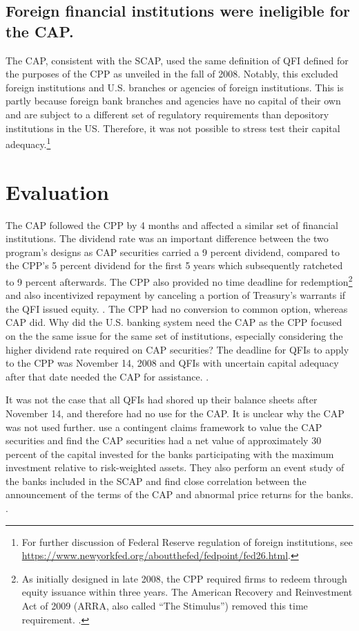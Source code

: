 \documentclass[12pt]{article}
\begin{document}
\subsection{Foreign financial institutions were ineligible for the CAP.}

The CAP, consistent with the SCAP, used the same definition of QFI defined for the purposes of the CPP as unveiled in the fall of 2008. Notably, this excluded foreign institutions and U.S. branches or agencies of foreign institutions. This is partly because foreign bank branches and agencies have no capital of their own and are subject to a different set of regulatory requirements than depository institutions in the US. Therefore, it was not possible to stress test their capital adequacy.\footnote{For further discussion of Federal Reserve regulation of foreign institutions, see \url{https://www.newyorkfed.org/aboutthefed/fedpoint/fed26.html}.}

\section{Evaluation}

The CAP followed the CPP by 4 months and affected a similar set of financial institutions. The dividend rate was an important difference between the two program's designs as CAP securities carried a 9 percent dividend, compared to the CPP's 5 percent dividend for the first 5 years which subsequently ratcheted to 9 percent afterwards. The CPP also provided no time deadline for redemption\footnote{As initially designed in late 2008, the CPP required firms to redeem through equity issuance within three years. The American Recovery and Reinvestment Act of 2009 (ARRA, also called ``The Stimulus”) removed this time requirement. \citep{GW}.} and also incentivized repayment by canceling a portion of Treasury's warrants if the QFI issued equity. \citep{GW}. The CPP had no conversion to common option, whereas CAP did. Why did the U.S. banking system need the CAP as the CPP focused on the the same issue for the same set of institutions, especially considering the higher dividend rate required on CAP securities? The deadline for QFIs to apply to the CPP was November 14, 2008 and QFIs with uncertain capital adequacy after that date needed the CAP for assistance. \citep{CPPFaq}.

It was not the case that all QFIs had shored up their balance sheets after November 14, and therefore had no use for the CAP. It is unclear why the CAP was not used further. \citet{GW} use a contingent claims framework to value the CAP securities and find the CAP securities had a net value of approximately 30 percent of the capital invested for the banks participating with the maximum investment relative to risk-weighted assets. They also perform an event study of the banks included in the SCAP and find close correlation between the announcement of the terms of the CAP and abnormal price returns for the banks. \citep{GW}.
\end{document}
